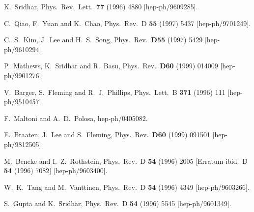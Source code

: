 \begin{thebibliography}{999}
K.~Sridhar,
Phys.\ Rev.\ Lett.\  {\bf 77} (1996) 4880
[hep-ph/9609285].

C.~Qiao, F.~Yuan and K.~Chao,
Phys.\ Rev.\ D {\bf 55} (1997) 5437
[hep-ph/9701249].
 
C.~S.~Kim, J.~Lee and H.~S.~Song,
Phys.\ Rev.\  {\bf D55} (1997) 5429
[hep-ph/9610294].
 
P.~Mathews, K.~Sridhar and R.~Basu,
Phys.\ Rev.\  {\bf D60} (1999) 014009
[hep-ph/9901276].
 
V.~Barger, S.~Fleming and R.~J.~Phillips,
Phys.\ Lett.\ B {\bf 371} (1996) 111
[hep-ph/9510457].

F.~Maltoni and A.~D.~Polosa,
hep-ph/0405082.

E.~Braaten, J.~Lee and S.~Fleming,
Phys.\ Rev.\  {\bf D60} (1999) 091501
[hep-ph/9812505].



M.~Beneke and I.~Z.~Rothstein,
Phys.\ Rev.\ D {\bf 54} (1996) 2005
[Erratum-ibid.\ D {\bf 54} (1996) 7082]
[hep-ph/9603400].

W.~K.~Tang and M.~Vanttinen,
Phys.\ Rev.\ D {\bf 54} (1996) 4349
[hep-ph/9603266].

S.~Gupta and K.~Sridhar,
Phys.\ Rev.\ D {\bf 54} (1996) 5545
[hep-ph/9601349].


\end{thebibliography}
